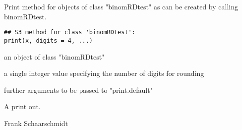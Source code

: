 \begin{Description}\relax
Print method for objects of class "binomRDtest" as can be created by calling binomRDtest.
\end{Description}
\begin{Usage}
\begin{verbatim}
## S3 method for class 'binomRDtest':
print(x, digits = 4, ...)
\end{verbatim}
\end{Usage}
\begin{Arguments}
\begin{ldescription}
\item[\code{x}] an object of class "binomRDtest" 
\item[\code{digits}] a single integer value specifying the number of digits for rounding 
\item[\code{...}] further arguments to be passed to "print.default" 
\end{ldescription}
\end{Arguments}
\begin{Value}
A print out.
\end{Value}
\begin{Author}\relax
Frank Schaarschmidt
\end{Author}

